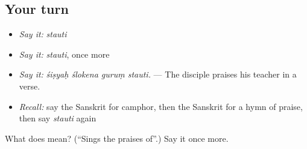 \subsection*{Your turn}
\begin{itemize}
\raggedright
  \item \emph{Say it:} \emph{stauti}
  \item \emph{Say it:} \emph{stauti}, once more
  \item \emph{Say it:} \emph{śiṣyaḥ ślokena guruṃ stauti.} — The disciple praises his teacher in a verse.
  \item \emph{Recall:} say the Sanskrit for camphor, then the Sanskrit for a hymn of praise, then say \emph{stauti} again
\end{itemize}

\begin{tcolorbox}[breakable,colback=teal!4,colframe=teal!35!black,title={Before you move on}]
What does  mean? (\textquotedblleft{}Sings the praises of\textquotedblright{}.) Say it once more.
\end{tcolorbox}
